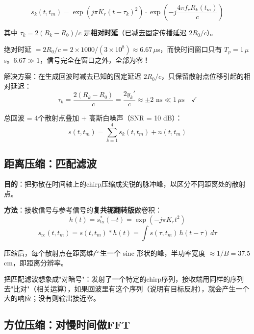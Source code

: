\documentclass[12pt, a4paper]{article}
\begin{document}
\begin{equation}
s_k(t, t_m) = \exp\!\left(j\pi K_r(t - \tau_k)^2\right) \cdot \exp\!\left(-j\frac{4\pi f_c R_k(t_m)}{c}\right)
\end{equation}

其中 $\tau_k = 2(R_k - R_0)/c$ 是\textbf{相对时延}（已减去固定传播延迟 $2R_0/c$）。

\begin{warnbox}[为什么必须用相对时延？]
绝对时延 $= 2R_0/c = 2\times1000/(3\times10^8) \approx 6.67\,\mu$s，而快时间窗口只有 $T_p = 1\,\mu$s。$6.67 \gg 1$，信号完全在窗口之外，全部为零！

解决方案：在生成回波时减去已知的固定延迟 $2R_0/c$，只保留散射点位移引起的相对延迟：
\[
\tau_k = \frac{2(R_k - R_0)}{c} = \frac{2y_k'}{c} \approx \pm 2\text{ ns} \ll 1\,\mu\text{s} \quad \checkmark
\]
\end{warnbox}

总回波 = 4个散射点叠加 + 高斯白噪声（SNR = 10 dB）：
\begin{equation}
s(t, t_m) = \sum_{k=1}^{4} s_k(t, t_m) + n(t, t_m)
\end{equation}

\subsection{距离压缩：匹配滤波}

\textbf{目的}：把弥散在时间轴上的chirp压缩成尖锐的脉冲峰，以区分不同距离处的散射点。

\textbf{方法}：接收信号与参考信号的\textbf{复共轭翻转版}做卷积：
\begin{equation}
h(t) = s_\text{tx}^*(-t) = \exp\!\left(-j\pi K_r t^2\right)
\end{equation}
\begin{equation}
s_\text{rc}(t, t_m) = s(t, t_m) * h(t) = \int s(\tau, t_m)\, h(t-\tau)\,d\tau
\end{equation}

压缩后，每个散射点在距离维产生一个 sinc 形状的峰，半功率宽度 $\approx 1/B = 37.5$ cm，即距离分辨率。

\begin{intubox}[直觉理解]
把匹配滤波想象成"对暗号"：发射了一个特定的chirp序列，接收端用同样的序列去"比对"（相关运算），如果回波里有这个序列（说明有目标反射），就会产生一个大的响应；没有则输出接近零。
\end{intubox}

\subsection{方位压缩：对慢时间做FFT}
\end{document}
